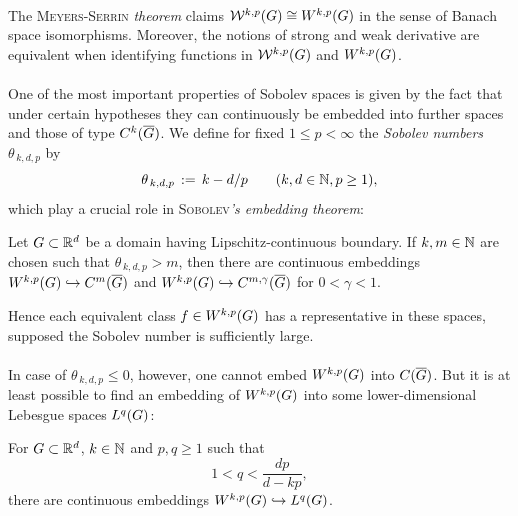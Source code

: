 \documentclass[11pt,twoside]{article}
\begin{document}
\begin{itemize}[leftmargin=15pt,itemsep=6pt]
\paragraph*{} %
The \textsc{Meyers-Serrin} \textit{theorem} claims
${\mathcal{W}}^{k,p}(G) \cong W^{k,p}(G)$ in the sense of Banach space isomorphisms.
Moreover,
the notions of strong and weak derivative are equivalent
when identifying functions in ${\mathcal{W}}^{k,p}(G)$ and $W^{k,p}(G)$.

\paragraph*{} %
One of the most important properties of Sobolev spaces is given by the fact
that under certain hypotheses they can continuously be embedded
into further spaces and those of type $C^k(\overline{G})$.
We define for fixed $1 \leq p < \infty$
the \textit{Sobolev numbers} $\theta_{\,k,d,p}$ by
\[
\theta_{\,k,d,p} \,:=\, k - d/p
\quad \quad (k,d \in {\mathbb{N}}, p \geq 1),
\]
which play a crucial role in \textsc{Sobolev}\textit{'s embedding theorem}:

\begin{theorem}\label{SOBOLEV_EMBEDDING_THEOREM_I}
Let $G \subset {\mathbb{R}}^d$ be a domain having Lipschitz-continuous boundary.
If $k,m \in {\mathbb{N}}$ are chosen such that $\theta_{\,k,d,p} > m$,
then there are continuous embeddings
$W^{k,p}(G) \hookrightarrow C^m(\overline{G})$ and
$W^{k,p}(G) \hookrightarrow C^{m,\gamma}(\overline{G})$ for $0 < \gamma < 1$.
\end{theorem}

Hence each equivalent class $f \in W^{k,p}(G)$ has a representative in these spaces,
supposed the Sobolev number is sufficiently large.

\paragraph*{} %
In case of $\theta_{\,k,d,p} \leq 0$,
however,
one cannot embed $W^{k,p}(G)$ into $C(\overline{G})$.
But it is at least possible to find an embedding of $W^{k,p}(G)$
into some lower-dimensional Lebesgue spaces $L^q(G)$:

\begin{theorem}\label{SOBOLEV_EMBEDDING_THEOREM_II}
For $G \subset {\mathbb{R}}^d$,
$k \in {\mathbb{N}}$ and $p,q \geq 1$ such that
\[
1 < q < \frac{dp}{d-kp},
\]
there are continuous embeddings $W^{k,p}(G) \hookrightarrow L^q(G)$.
\end{theorem}


\end{itemize}
\end{document}
